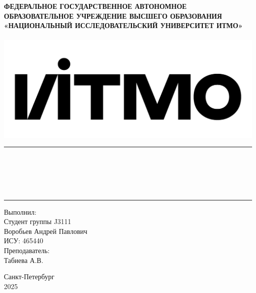 \documentclass[12pt, a4paper]{article}
\begin{document}
    \thispagestyle{empty}

    \begin{center}
    {\Large\textbf{ФЕДЕРАЛЬНОЕ ГОСУДАРСТВЕННОЕ АВТОНОМНОЕ ОБРАЗОВАТЕЛЬНОЕ УЧРЕЖДЕНИЕ ВЫСШЕГО ОБРАЗОВАНИЯ}}
        \\
        {\Large\textbf{«НАЦИОНАЛЬНЫЙ ИССЛЕДОВАТЕЛЬСКИЙ УНИВЕРСИТЕТ ИТМО»}}\\[5mm]
        {\large{}}\\[5mm]
        \includegraphics[scale=0.14]{logo.png}\\[30mm]
        \rule{\textwidth}{0.4mm}\\[3mm]
        {\Large{}}\\[3mm]
        {\Large{}}\\[3mm]
        {\Large{}}\\[3mm]
        \rule{\textwidth}{0.4mm}
    \end{center}

    \vfill

    \begin{flushright}
        \large Выполнил: \\
        Студент группы J3111 \\
        Воробьев Андрей Павлович \\
        ИСУ: 465440 \\
        Преподаватель: \\
        Табиева А.В. \\
    \end{flushright}

    \vfill

    \begin{center}
        \large Санкт-Петербург \\
        \large 2025
    \end{center}

    \newpage

    \titleformat{\section}{\Large\bfseries\raggedright}{}{0em}{}
    \titleformat{\subsection}{\large\bfseries\raggedright}{}{0em}{}

    
\end{document}
